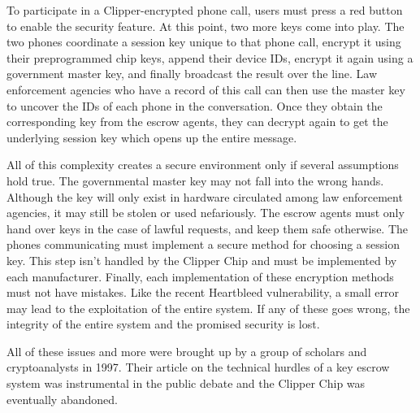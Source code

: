 \documentclass[12pt]{turabian-researchpaper}
\begin{document}
To participate in a Clipper-encrypted phone call, users must press a red button to enable the security feature. At this point, two more keys come into play.
The two phones coordinate a session key unique to that phone call, encrypt it using their preprogrammed chip keys, append their device IDs, encrypt it again using a government master key, and finally broadcast the result over the line.
Law enforcement agencies who have a record of this call can then use the master key to uncover the IDs of each phone in the conversation.
Once they obtain the corresponding key from the escrow agents, they can decrypt again to get the underlying session key which opens up the entire message.

All of this complexity creates a secure environment only if several assumptions hold true.
The governmental master key may not fall into the wrong hands. Although the key will only exist in hardware circulated among law enforcement agencies, it may still be stolen or used nefariously.
The escrow agents must only hand over keys in the case of lawful requests, and keep them safe otherwise.
The phones communicating must implement a secure method for choosing a session key. This step isn't handled by the Clipper Chip and must be implemented by each manufacturer.
Finally, each implementation of these encryption methods must not have mistakes. Like the recent Heartbleed vulnerability, a small error may lead to the exploitation of the entire system.
If any of these goes wrong, the integrity of the entire system and the promised security is lost.

All of these issues and more were brought up by a group of scholars and cryptoanalysts in 1997.
Their article on the technical hurdles of a key escrow system was instrumental in the public debate and the Clipper Chip was eventually abandoned.
\end{document}
